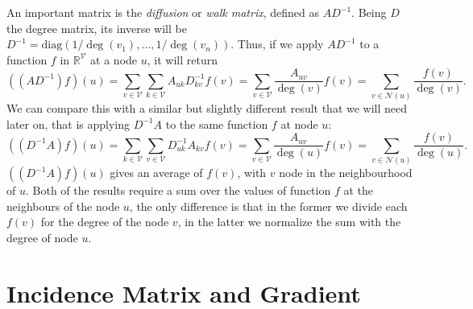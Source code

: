 \documentclass[12pt,a4paper]{report}
\theoremstyle{definition}
\begin{document}
An important matrix is the \emph{diffusion} or \emph{walk matrix}, defined as $A D^{-1}$. Being $D$ the degree matrix, its inverse will be $D^{-1} = \text{diag}\left(1/\deg(v_1), \ldots, 1/\deg(v_n) \right)$. Thus, if we apply $AD^{-1}$ to a function $f$ in $\mathbb{R}^{\mathcal{V}}$ at a node $u$, it will return
\begin{equation*}
    \left( \left( AD^{-1}\right) f \right) (u) = \sum_{v \in \mathcal{V}} \sum_{k \in \mathcal{V}}  A_{uk} D^{-1}_{kv} f(v) = \sum_{v \in \mathcal{V}} \frac{A_{uv}}{\deg(v)} f(v) = \sum_{v \in \mathcal{N}(u)} \frac{f (v)}{\deg(v)}.
\end{equation*}
We can compare this with a similar but slightly different result that we will need later on, that is applying $D^{-1} A$ to the same function $f$ at node $u$:
\begin{equation*}
    \left( \left( D^{-1} A\right) f \right) (u) = \sum_{k \in \mathcal{V}} \sum_{v \in \mathcal{V}}  D^{-1}_{uk} A_{kv} f(v) = \sum_{v \in \mathcal{V}} \frac{A_{uv}}{\deg(u)} f(v) = \sum_{v \in \mathcal{N}(u)} \frac{f (v)}{\deg(u)}.
\end{equation*}
$\left( (D^{-1} A) f \right)(u)$ gives an average of $f(v)$, with $v$ node in the neighbourhood of $u$.
Both of the results require a sum over the values of function $f$ at the neighbours of the node $u$, the only difference is that in the former we divide each $f(v)$ for the degree of the node $v$, in the latter we normalize the sum with the degree of node $u$.

\section{Incidence Matrix and Gradient}
\label{sec:incidence_gradient}
\end{document}
